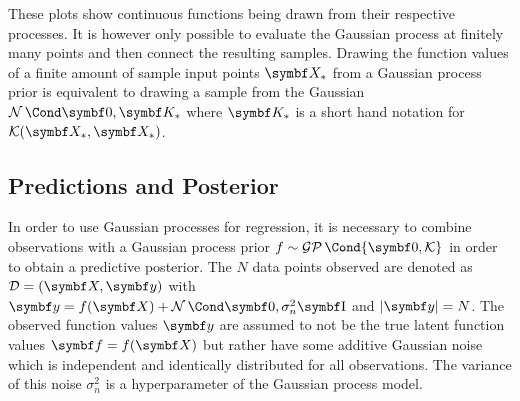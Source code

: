 These plots show continuous functions being drawn from their respective processes.
It is however only possible to evaluate the Gaussian process at finitely many points and then connect the resulting samples.
Drawing the function values of a finite amount of sample input points $\mat{X_\ast}$ from a Gaussian process prior is equivalent to drawing a sample from the Gaussian $\Gaussian{\mat{0}, \mat{K_\ast}}$ where $\mat{K_\ast}$ is a short hand notation for $\K(\mat{X_\ast}, \mat{X_\ast})$.

\subsection{Predictions and Posterior}
In order to use Gaussian processes for regression, it is necessary to combine observations with a Gaussian process prior $f \sim \GP\Cond{\mat{0}, \K}$ in order to obtain a predictive posterior.
The $N$ data points observed are denoted as $\Dc = \left( \mat{X}, \mat{y} \right)$ with $\mat{y} = f(\mat{X}) + \Gaussian{\mat{0}, \sigma_n^2 \Eye}$ and $\abs{\mat{y}} = N$.
The observed function values $\mat{y}$ are assumed to not be the true latent function values $\mat{f} = f(\mat{X})$ but rather have some additive Gaussian noise which is independent and identically distributed for all observations.
The variance of this noise $\sigma_n^2$ is a hyperparameter of the Gaussian process model.

